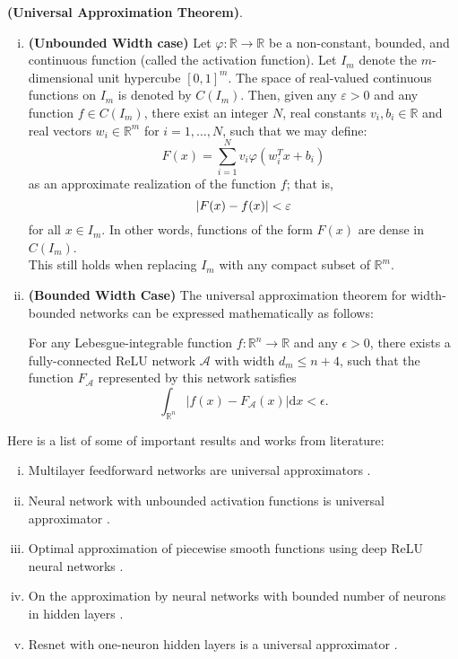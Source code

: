 \begin{thm}
	\label{universal_approximation_theorem}
	\textbf{(Universal Approximation Theorem)}.
	\begin{enumerate}[i.]
		\item \textbf{(Unbounded Width case)} Let $\varphi :\mathbb {R} \to \mathbb {R}$ be a non-constant, bounded, and continuous function (called the activation function). Let $I_{m}$ denote the $m$-dimensional unit hypercube $[0,1]^{m}$. The space of real-valued continuous functions on $I_m$ is denoted by  $C(I_{m})$. Then, given any $\varepsilon > 0$ and any function  $f\in C(I_{m})$, there exist an integer  $N$, real constants $v_{i},b_{i}\in \mathbb  {R}$ and real vectors $w_{i}\in \mathbb {R} ^{m}$ for $i=1,\dots ,N$, such that we may define:	
		 \begin{equation*}
		  F(x)=\sum _{{i=1}}^{{N}}v_{i}\varphi \left(w_{i}^{T}x+b_{i}\right)
		 \end{equation*}
		as an approximate realization of the function $f$; that is,
		\begin{equation*}
		\vert F(x) - f (x)\vert  < \varepsilon
		\end{equation*}
		for all $x\in I_{m}$. In other words, functions of the form $F(x)$ are dense in $C(I_{m})$.\\	
		This still holds when replacing $I_m$ with any compact subset of $\mathbb {R} ^{m}$.
		\item \textbf{(Bounded Width Case)} The universal approximation theorem for width-bounded networks can be expressed mathematically as follows:
		
		For any Lebesgue-integrable function $f:\mathbb {R} ^{n}\rightarrow \mathbb {R}$ and any $\epsilon >0$, there exists a fully-connected ReLU network $\mathcal {A}$ with width $ d_{m}\leq {n+4}$, such that the function $F_{\mathcal {A}}$ represented by this network satisfies
		\begin{equation*}
		\int _{\mathbb {R} ^{n}}\left|f(x)-F_{\mathcal {A}}(x)\right|\mathrm {d} x<\epsilon.
		\end{equation*}
	\end{enumerate}
\end{thm}
Here is a list of some of important results and works from literature:
\begin{enumerate}[i.]
	\item Multilayer feedforward networks are universal approximators \cite{hornik1989multilayer}.
	\item Neural network with unbounded activation functions is universal approximator \cite{sonoda2017neural}.
	\item Optimal approximation of piecewise smooth functions using deep ReLU neural networks \cite{petersen2018optimal}.
	\item On the approximation by neural networks with bounded number of neurons in hidden layers \cite{ismailov2014approximation}.
	\item Resnet with one-neuron hidden layers is a universal approximator \cite{lin2018resnet}.
\end{enumerate}
